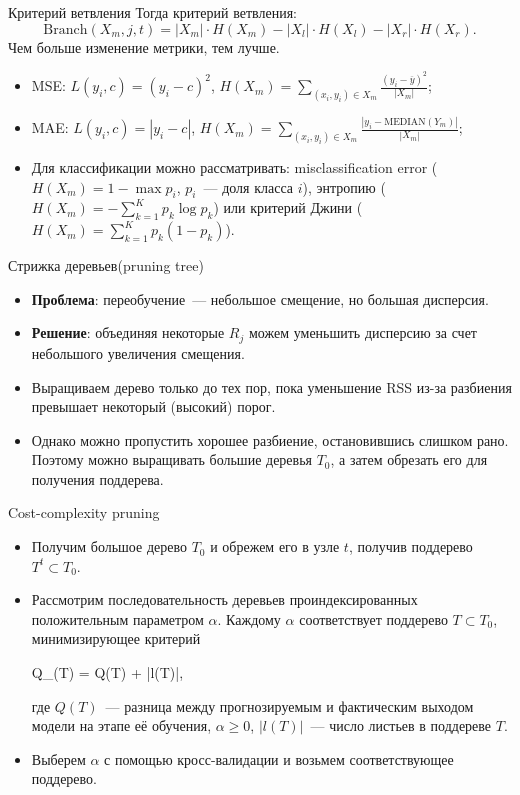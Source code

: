 \documentclass[notheorems, handout]{beamer}
\begin{document}
\begin{frame}{Критерий ветвления}
	Тогда критерий ветвления:
	\[
	\mathrm{Branch} (X _m, j, t) = |X _m| \cdot H(X _m) - |X _l| \cdot H(X _l) - |X _r| \cdot H(X _r).
	\]
	Чем больше изменение метрики, тем лучше.

	\begin{itemize}
		\item MSE: $L (y _i, c) = (y _i - c) ^2$, $H (X _m) = \sum \limits _{(x _i, y _i) \in X _m} \frac {(y _i - \overline{y}) ^2} {|X _m|}$;
		\item MAE: $L (y _i, c) = |y _i - c|$, $H (X _m) = \sum \limits _{(x _i, y _i) \in X _m} \frac {|y _i - \mathrm{MEDIAN}(Y _m)|} {|X _m|}$;
		\item Для классификации можно рассматривать: misclassification error ($H (X _m) = 1 - \max p _i$, $p _i$~--- доля класса $i$), энтропию ($H (X _m) = - \sum ^K _{k = 1} p _k \log p_k$) или критерий Джини ($H (X _m) = \sum ^K _{k = 1} p _k (1 - p_k)$).
	\end{itemize}
\end{frame}

\begin{frame}{Стрижка деревьев(pruning tree)}
\begin{itemize}
	\item \textbf{Проблема}: переобучение~--- небольшое смещение, но большая дисперсия.
	\item \textbf{Решение}: объединяя некоторые $R_{j}$ можем уменьшить дисперсию за счет небольшого увеличения смещения.
	\item Выращиваем дерево только до тех пор, пока уменьшение RSS из-за разбиения превышает некоторый (высокий) порог.
	\item Однако можно пропустить хорошее разбиение, остановившись слишком рано. Поэтому можно выращивать большие деревья $T_{0}$, а затем обрезать его для получения поддерева.
\end{itemize}
\end{frame}

\begin{frame}{Cost-complexity pruning}
\begin{itemize}
	\item Получим большое дерево $T_{0}$ и обрежем его в узле $t$, получив поддерево $T^{t} \subset T_{0}$.
	\item Рассмотрим последовательность деревьев проиндексированных положительным параметром $\alpha$. Каждому $\alpha$ соответствует поддерево $T \subset T_{0}$, минимизирующее критерий
		\begin{flalign*}
			Q_{\alpha}(T) = Q(T) + \alpha |l(T)|,
		\end{flalign*}
где $Q(T)$~--- разница между прогнозируемым и фактическим выходом модели на этапе её обучения, $\alpha \geq 0$, $|l(T)|$~--- число листьев в поддереве $T$. 
	\item Выберем $\alpha$ с помощью кросс-валидации и возьмем соответствующее поддерево.
\end{itemize}
\end{frame}
\end{document}
